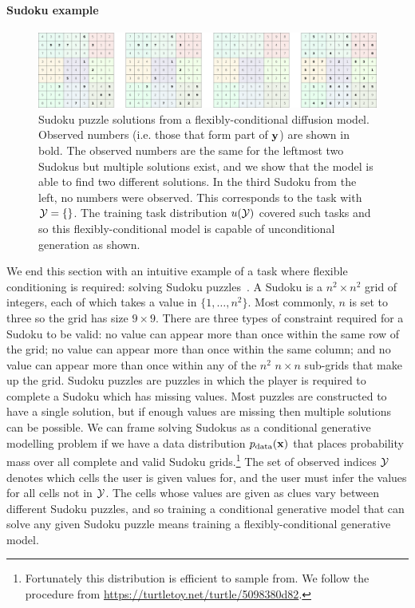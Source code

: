 \paragraph{Sudoku example}
\begin{figure}[t]
    \centering
    \includegraphics[width=\textwidth]{figs/thesis/sudoku_panel.pdf}
    \caption{Sudoku puzzle solutions from a flexibly-conditional diffusion model. Observed numbers (i.e. those that form part of ${\mathbf{y}}$) are shown in bold. The observed numbers are the same for the leftmost two Sudokus but multiple solutions exist, and we show that the model is able to find two different solutions. In the third Sudoku from the left, no numbers were observed. This corresponds to the task with ${\mathcal{Y}} = \{\}$. The training task distribution $u({\mathcal{Y}})$ covered such tasks and so this flexibly-conditional model is capable of unconditional generation as shown. }
    \label{fig:sudoku-panel}
\end{figure}
We end this section with an intuitive example of a task where flexible conditioning is required: solving Sudoku puzzles~\citep{weilbach2023graphically}. A Sudoku is a $n^2 \times n^2$ grid of integers, each of which takes a value in $\{1,\ldots,n^2\}$. Most commonly, $n$ is set to three so the grid has size $9 \times 9$. There are three types of constraint required for a Sudoku to be valid: no value can appear more than once within the same row of the grid; no value can appear more than once within the same column; and no value can appear more than once within any of the $n^2$ $n \times n$ sub-grids that make up the grid. Sudoku puzzles are puzzles in which the player is required to complete a Sudoku which has missing values. Most puzzles are constructed to have a single solution, but if enough values are missing then multiple solutions can be possible. We can frame solving Sudokus as a conditional generative modelling problem if we have a data distribution $p_{\rm{data}}({\mathbf{x}})$ that places probability mass over all complete and valid Sudoku grids.\footnote{Fortunately this distribution is efficient to sample from. We follow the procedure from \url{https://turtletoy.net/turtle/5098380d82}.} The set of observed indices ${\mathcal{Y}}$ denotes which cells the user is given values for, and the user must infer the values for all cells not in ${\mathcal{Y}}$. The cells whose values are given as clues vary between different Sudoku puzzles, and so training a conditional generative model that can solve any given Sudoku puzzle means training a flexibly-conditional generative model. 


